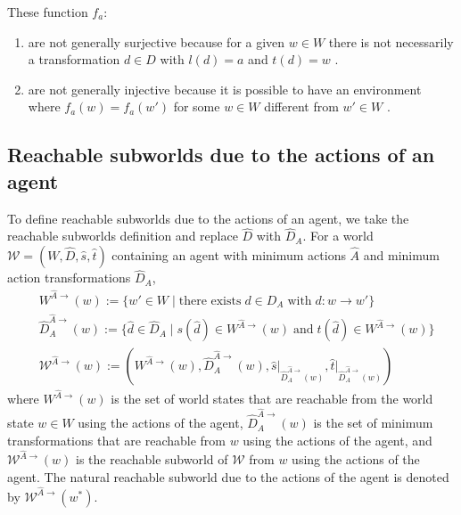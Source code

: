 These function $f_{a}$:
\begin{enumerate}[(1)]
	\item are not generally surjective because for a given $w \in W$ there is not necessarily a transformation $d \in D$ with $l(d) = a$ and $t(d) = w$ .

	\item are not generally injective because it is possible to have an environment where $f_{a}(w)=f_{a}(w')$ for some $w \in W$ different from $w' \in W$ .
\end{enumerate}


\subsection{Reachable subworlds due to the actions of an agent}


To define reachable subworlds due to the actions of an agent, we take the reachable subworlds definition and replace $\hat{D}$ with $\hat{D}_{A}$.
For a world $\mathscr{W} = (W, \hat{D}, \hat{s}, \hat{t})$ containing an agent with minimum actions $\hat{A}$ and minimum action transformations $\hat{D}_{A}$,
\begin{align}
    & W^{\hat{A}\to}(w) := \{ w' \in W \mid \text{there exists} \; d \in D_{A} \; \text{with} \; d: w \to w' \} \\
    & \hat{D}_{A}^{\hat{A}\to}(w) := \{ \hat{d} \in \hat{D}_{A} \mid s(\hat{d}) \in W^{\hat{A}\to}(w) \; \text{and} \; t(\hat{d}) \in W^{\hat{A}\to}(w) \} \\
    & \mathscr{W}^{\hat{A}\to}(w) := (W^{\hat{A}\to}(w), \hat{D}_{A}^{\hat{A}\to}(w), \hat{s} \big|_{\hat{D}_{A}^{\hat{A}\to}(w)}, \hat{t} \big|_{\hat{D}_{A}^{\hat{A}\to}(w)})
\end{align}
where $W^{\hat{A}\to}(w)$ is the set of world states that are reachable from the world state $w \in W$ using the actions of the agent, $\hat{D}_{A}^{\hat{A}\to}(w)$ is the set of minimum transformations that are reachable from $w$ using the actions of the agent, and $\mathscr{W}^{\hat{A}\to}(w)$ is the reachable subworld of $\mathscr{W}$ from $w$ using the actions of the agent.
The natural reachable subworld due to the actions of the agent is denoted by $\mathscr{W}^{\hat{A}\to}(w^{*})$.


